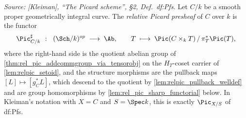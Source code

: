 \begin{definition}
  \label{def:rel_pic_sharp}

  \textit{Source: [Kleiman], ``The Picard scheme'', \S 2,
  Def.~df:Pfs.}
  Let \(C/k\) be a smooth proper geometrically integral curve. The
  \emph{relative Picard presheaf} of \(C\) over \(k\) is the functor
  \[
    \Pic^\sharp_{C/k} \;\;\colon\;\; (\Sch/k)^{op} \;\longrightarrow\; \Ab,
    \qquad
    T \;\longmapsto\; \Pic(C \times_k T) \,/\, \pi_T^*\Pic(T),
  \]
  where the right-hand side is the quotient abelian group of
  \cref{thm:rel_pic_addcommgroup_via_tensorobj} on the \(H_T\)-coset
  carrier of \cref{lem:relpic_setoid}, and the structure morphisms are the
  pullback maps \([L] \mapsto [g_C^* L]\), which descend to the quotient by
  \cref{lem:relpic_pullback_welldef} and are group homomorphisms by
  \cref{lem:rel_pic_sharp_functorial} below. In Kleiman's notation with
  \(X = C\) and \(S = \Spec k\), this is exactly \(\Pic_{X/S}\) of df:Pfs.
\end{definition}


